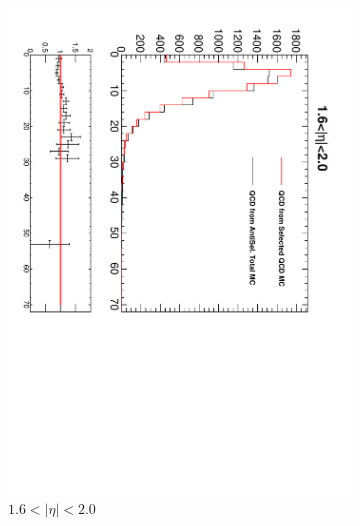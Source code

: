 \begin{figure}[htbp]
\begin{subfigure}{0.45\textwidth}
    \includegraphics*[trim = 0mm 0mm 15mm 0mm, clip, width=\textwidth, angle=90]{MetCompare_anti_eta5.pdf}
    \caption{$1.6<| \eta |<2.0$}
    \label{fig:qcd_met_eta5}
  \end{subfigure}
  \begin{subfigure}{0.45\textwidth}
    \centering

\end{subfigure}
\end{figure}

